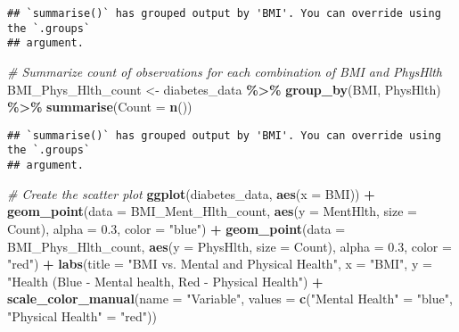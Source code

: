 \documentclass[
]{article}
\newenvironment{Shaded}{\begin{snugshade}}{\end{snugshade}}
\newcommand{\AttributeTok}[1]{\textcolor[rgb]{0.13,0.29,0.53}{#1}}
\newcommand{\CommentTok}[1]{\textcolor[rgb]{0.56,0.35,0.01}{\textit{#1}}}
\newcommand{\FloatTok}[1]{\textcolor[rgb]{0.00,0.00,0.81}{#1}}
\newcommand{\FunctionTok}[1]{\textcolor[rgb]{0.13,0.29,0.53}{\textbf{#1}}}
\newcommand{\NormalTok}[1]{#1}
\newcommand{\OtherTok}[1]{\textcolor[rgb]{0.56,0.35,0.01}{#1}}
\newcommand{\SpecialCharTok}[1]{\textcolor[rgb]{0.81,0.36,0.00}{\textbf{#1}}}
\newcommand{\StringTok}[1]{\textcolor[rgb]{0.31,0.60,0.02}{#1}}
\begin{document}
\begin{verbatim}
## `summarise()` has grouped output by 'BMI'. You can override using the `.groups`
## argument.
\end{verbatim}

\begin{Shaded}
\begin{Highlighting}[]
\CommentTok{\# Summarize count of observations for each combination of BMI and PhysHlth}
\NormalTok{BMI\_Phys\_Hlth\_count }\OtherTok{\textless{}{-}}\NormalTok{ diabetes\_data }\SpecialCharTok{\%\textgreater{}\%}
  \FunctionTok{group\_by}\NormalTok{(BMI, PhysHlth) }\SpecialCharTok{\%\textgreater{}\%}
  \FunctionTok{summarise}\NormalTok{(}\AttributeTok{Count =} \FunctionTok{n}\NormalTok{())}
\end{Highlighting}
\end{Shaded}

\begin{verbatim}
## `summarise()` has grouped output by 'BMI'. You can override using the `.groups`
## argument.
\end{verbatim}

\begin{Shaded}
\begin{Highlighting}[]
\CommentTok{\# Create the scatter plot}
\FunctionTok{ggplot}\NormalTok{(diabetes\_data, }\FunctionTok{aes}\NormalTok{(}\AttributeTok{x =}\NormalTok{ BMI)) }\SpecialCharTok{+}
  \FunctionTok{geom\_point}\NormalTok{(}\AttributeTok{data =}\NormalTok{ BMI\_Ment\_Hlth\_count, }\FunctionTok{aes}\NormalTok{(}\AttributeTok{y =}\NormalTok{ MentHlth, }\AttributeTok{size =}\NormalTok{ Count), }\AttributeTok{alpha =} \FloatTok{0.3}\NormalTok{, }\AttributeTok{color =} \StringTok{"blue"}\NormalTok{) }\SpecialCharTok{+}
  \FunctionTok{geom\_point}\NormalTok{(}\AttributeTok{data =}\NormalTok{ BMI\_Phys\_Hlth\_count, }\FunctionTok{aes}\NormalTok{(}\AttributeTok{y =}\NormalTok{ PhysHlth, }\AttributeTok{size =}\NormalTok{ Count), }\AttributeTok{alpha =} \FloatTok{0.3}\NormalTok{, }\AttributeTok{color =} \StringTok{"red"}\NormalTok{) }\SpecialCharTok{+}
  \FunctionTok{labs}\NormalTok{(}\AttributeTok{title =} \StringTok{"BMI vs. Mental and Physical Health"}\NormalTok{,}
       \AttributeTok{x =} \StringTok{"BMI"}\NormalTok{,}
       \AttributeTok{y =} \StringTok{"Health (Blue {-} Mental health, Red {-} Physical Health"}\NormalTok{) }\SpecialCharTok{+}
  \FunctionTok{scale\_color\_manual}\NormalTok{(}\AttributeTok{name =} \StringTok{"Variable"}\NormalTok{, }\AttributeTok{values =} \FunctionTok{c}\NormalTok{(}\StringTok{"Mental Health"} \OtherTok{=} \StringTok{"blue"}\NormalTok{, }\StringTok{"Physical Health"} \OtherTok{=} \StringTok{"red"}\NormalTok{))}
\end{Highlighting}
\end{Shaded}
\end{document}
